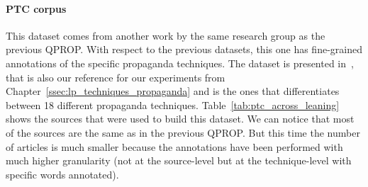 \paragraph{PTC corpus}
This dataset comes from another work by the same research group as the previous QPROP.
With respect to the previous datasets, this one has fine-grained annotations of the specific propaganda techniques. The dataset is presented in~\citet{da2019fine}, that is also our reference for our experiments from Chapter~\ref{ssec:lp_techniques_propaganda} and is the ones that differentiates between 18 different propaganda techniques.
Table~\ref{tab:ptc_across_leaning} shows the sources that were used to build this dataset. We can notice that most of the sources are the same as in the previous QPROP. But this time the number of articles is much smaller because the annotations have been performed with much higher granularity (not at the source-level but at the technique-level with specific words annotated).

